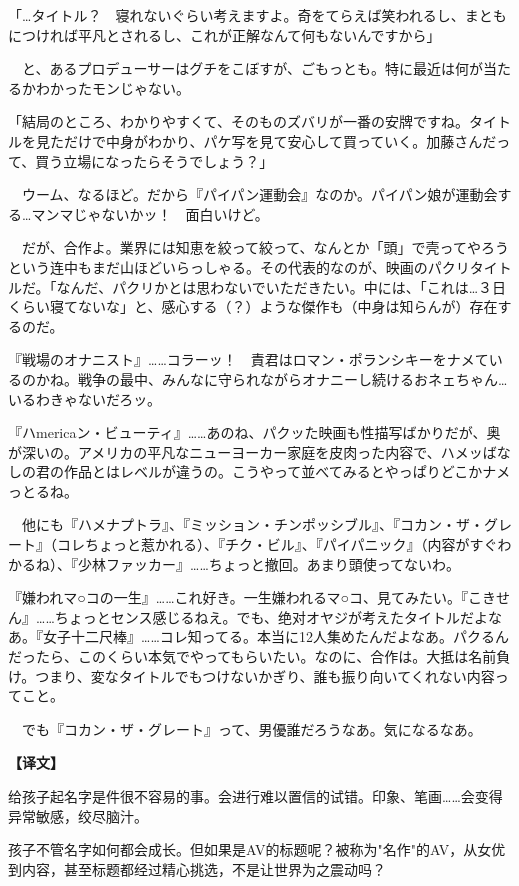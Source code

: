 \documentclass[12pt,UTF8]{ctexbook}
\begin{document}
{{「…タイトル？　寝れないぐらい考えますよ。奇をてらえば笑われるし、まともにつければ平凡とされるし、これが正解なんて何もないんですから」

　と、あるプロデューサーはグチをこぼすが、ごもっとも。特に最近は何が当たるかわかったモンじゃない。

「結局のところ、わかりやすくて、そのものズバリが一番の安牌ですね。タイトルを見ただけで中身がわかり、パケ写を見て安心して買っていく。加藤さんだって、買う立場になったらそうでしょう？」

　ウーム、なるほど。だから『パイパン運動会』なのか。パイパン娘が運動会する…マンマじゃないかッ！　面白いけど。

　だが、合作よ。業界には知恵を絞って絞って、なんとか「頭」で壳ってやろうという连中もまだ山ほどいらっしゃる。その代表的なのが、映画のパクリタイトルだ。「なんだ、パクリかとは思わないでいただきたい。中には、「これは…３日くらい寝てないな」と、感心する（？）ような傑作も（中身は知らんが）存在するのだ。

『戦場のオナニスト』……コラーッ！　責君はロマン・ポランシキーをナメているのかね。戦争の最中、みんなに守られながらオナニーし続けるおネェちゃん…いるわきゃないだろッ。

『ハmericaン・ビューティ』……あのね、パクッた映画も性描写ばかりだが、奥が深いの。アメリカの平凡なニューヨーカー家庭を皮肉った内容で、ハメッばなしの君の作品とはレベルが違うの。こうやって並べてみるとやっぱりどこかナメっとるね。

　他にも『ハメナプトラ』、『ミッション・チンポッシブル』、『コカン・ザ・グレート』（コレちょっと惹かれる）、『チク・ビル』、『パイパニック』（内容がすぐわかるね）、『少林ファッカー』……ちょっと撤回。あまり頭使ってないわ。

『嫌われマ○コの一生』……これ好き。一生嫌われるマ○コ、見てみたい。『こきせん』……ちょっとセンス感じるねえ。でも、绝对オヤジが考えたタイトルだよなあ。『女子十二尺棒』……コレ知ってる。本当に12人集めたんだよなあ。パクるんだったら、このくらい本気でやってもらいたい。なのに、合作は。大抵は名前負け。つまり、変なタイトルでもつけないかぎり、誰も振り向いてくれない内容ってこと。

　でも『コカン・ザ・グレート』って、男優誰だろうなあ。気になるなあ。
}

\vspace{2ex}
\parbox{0.9\linewidth}{
\textbf{【译文】}\par

给孩子起名字是件很不容易的事。会进行难以置信的试错。印象、笔画……会变得异常敏感，绞尽脑汁。

孩子不管名字如何都会成长。但如果是AV的标题呢？被称为"名作"的AV，从女优到内容，甚至标题都经过精心挑选，不是让世界为之震动吗？

}}
\end{document}
